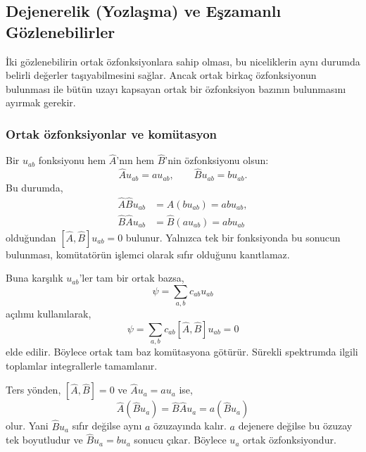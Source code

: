 \subsection{Dejenerelik (Yozlaşma) ve Eşzamanlı Gözlenebilirler}
\label{sec:05_dejenerelik}

İki gözlenebilirin ortak özfonksiyonlara sahip olması, bu niceliklerin
aynı durumda belirli değerler taşıyabilmesini sağlar. Ancak ortak
birkaç özfonksiyonun bulunması ile bütün uzayı kapsayan ortak bir
özfonksiyon bazının bulunmasını ayırmak gerekir.

\subsubsection{Ortak özfonksiyonlar ve komütasyon}

Bir $u_{ab}$ fonksiyonu hem $\hat A$'nın hem $\hat B$'nin
özfonksiyonu olsun:
\begin{equation}
 \hat A u_{ab}=a u_{ab},\qquad
 \hat B u_{ab}=b u_{ab}.
\end{equation}
Bu durumda,
\begin{align}
 \hat A\hat B u_{ab}&=\hat A(bu_{ab})=ab u_{ab},\\
 \hat B\hat A u_{ab}&=\hat B(au_{ab})=ab u_{ab}
\end{align}
olduğundan $[\hat A,\hat B]u_{ab}=0$ bulunur. Yalnızca tek bir
fonksiyonda bu sonucun bulunması, komütatörün işlemci olarak sıfır
olduğunu kanıtlamaz.

Buna karşılık $u_{ab}$'ler tam bir ortak bazsa,
\begin{equation}
 \psi=\sum_{a,b}c_{ab}u_{ab}
\end{equation}
açılımı kullanılarak,
\begin{equation}
 [\hat A,\hat B]\psi
 =\sum_{a,b}c_{ab}[\hat A,\hat B]u_{ab}=0
\end{equation}
elde edilir. Böylece ortak tam baz komütasyona götürür. Sürekli
spektrumda ilgili toplamlar integrallerle tamamlanır.

Ters yönden, $[\hat A,\hat B]=0$ ve $\hat A u_a=a u_a$ ise,
\begin{equation}
 \hat A(\hat B u_a)=\hat B\hat A u_a=a(\hat B u_a)
 \label{eq:05_ozuzay_korunur}
\end{equation}
olur. Yani $\hat B u_a$ sıfır değilse aynı $a$ özuzayında kalır.
$a$ dejenere değilse bu özuzay tek boyutludur ve
$\hat B u_a=b u_a$ sonucu çıkar. Böylece $u_a$ ortak özfonksiyondur.

